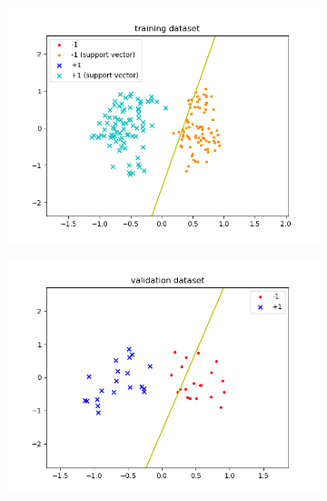 \documentclass[a4paper]{article}
\begin{document}
\begin{enumerate}
\begin{enumerate}
\begin{figure}[H]
\begin{subfigure}[b]{.45\linewidth}
                    \includegraphics[width=\linewidth]{../../img/3-3.png}
                \end{subfigure}
                \begin{subfigure}[b]{.45\linewidth}
                    \includegraphics[width=\linewidth]{../../img/3-4.png}
                \end{subfigure}
        \end{figure}
        

\end{enumerate}
\end{enumerate}
\end{document}
